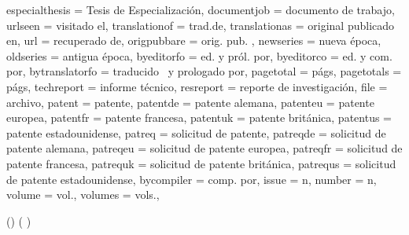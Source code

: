 {	especialthesis   = {Tesis de Especialización},
	documentjob      = {documento de trabajo},
	urlseen          = {visitado el\addspace},
	translationof    = {trad\adddot\addspace de},
	translationas    = {original publicado en},
	url              = {recuperado de},
	origpubbare      = {orig\adddotspace pub\adddotspace},
	newseries        = {nueva época},
	oldseries        = {antigua época},
	byeditorfo       = {ed\adddotspace y pról\adddotspace por},
	byeditorco       = {ed\adddotspace y com\adddotspace por},
	bytranslatorfo   = {traducido \lbx@lfromlang\ y prologado por},
	pagetotal        = {págs},
	pagetotals       = {págs},
	techreport       = {informe técnico},
	resreport        = {reporte de investigación},
	file             = {archivo},
	patent           = {patente},
	patentde         = {patente alemana},
	patenteu         = {patente europea},
	patentfr         = {patente francesa},
	patentuk         = {patente británica},
	patentus         = {patente estadounidense},
	patreq           = {solicitud de patente},
	patreqde         = {solicitud de patente alemana},
	patreqeu         = {solicitud de patente europea},
	patreqfr         = {solicitud de patente francesa},
	patrequk         = {solicitud de patente británica},
	patrequs         = {solicitud de patente estadounidense},
	bycompiler       = {comp\adddotspace por},
	issue            = {n},
	number           = {n},
	volume           = {vol\adddot},
	volumes          = {vols\adddot},
}

\makeatletter
{}
\makeatother

\DeclareCiteCommand{\citeyearpar}
{}
{%
	{(\bibhyperref{\printdate})}
	{%
		{(\bibhyperref{\printdate}}
		{%
			\ifnumequal{\value{citecount}}{\value{citetotal}}
			{\addcomma\addspace\bibhyperref{\printdate})}
			{\addcomma\addspace\bibhyperref{\printdate}}%
		}%
	}%
}
{}
{}

